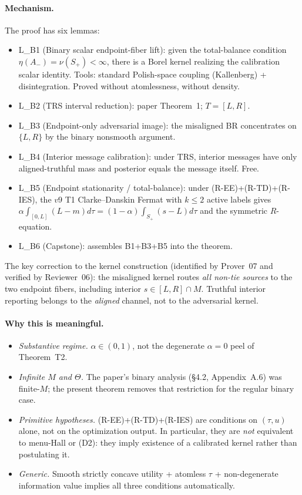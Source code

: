\documentclass[11pt]{article}
\theoremstyle{definition}
\theoremstyle{remark}
\begin{document}
\paragraph{Mechanism.} The proof has six lemmas:
\begin{itemize}
  \item L\_B1 (Binary scalar endpoint-fiber lift): given the
    total-balance condition $\eta(A_-) = \nu(S_+) < \infty$, there is a
    Borel kernel realizing the calibration scalar identity. Tools:
    standard Polish-space coupling (Kallenberg) + disintegration.
    Proved without atomlessness, without density.
  \item L\_B2 (TRS interval reduction): paper Theorem~1; $T = [L,R]$.
  \item L\_B3 (Endpoint-only adversarial image): the misaligned BR
    concentrates on $\{L, R\}$ by the binary nonsmooth argument.
  \item L\_B4 (Interior message calibration): under TRS, interior
    messages have only aligned-truthful mass and posterior equals the
    message itself. Free.
  \item L\_B5 (Endpoint stationarity / total-balance): under
    (R-EE)+(R-TD)+(R-IES), the $v9$ T1 Clarke--Danskin Fermat with
    $k\le 2$ active labels gives
    $\alpha\!\int_{[0,L]}(L-m)d\tau = (1-\alpha)\!\int_{S_+}(s-L)d\tau$
    and the symmetric $R$-equation.
  \item L\_B6 (Capstone): assembles B1+B3+B5 into the theorem.
\end{itemize}

The key correction to the kernel construction (identified by Prover~07
and verified by Reviewer~06): the misaligned kernel routes \emph{all
non-tie sources} to the two endpoint fibers, including interior
$s\in[L,R]\cap M$. Truthful interior reporting belongs to the
\emph{aligned} channel, not to the adversarial kernel.

\paragraph{Why this is meaningful.}
\begin{itemize}
  \item \emph{Substantive regime.} $\alpha\in(0,1)$, not the degenerate
    $\alpha=0$ peel of Theorem~T2.
  \item \emph{Infinite $M$ and $\Theta$.} The paper's binary analysis
    (\S4.2, Appendix~A.6) was finite-$M$; the present theorem removes
    that restriction for the regular binary case.
  \item \emph{Primitive hypotheses.} (R-EE)+(R-TD)+(R-IES) are
    conditions on $(\tau, u)$ alone, not on the optimization output.
    In particular, they are \emph{not} equivalent to menu-Hall or
    (D2): they imply existence of a calibrated kernel rather than
    postulating it.
  \item \emph{Generic.} Smooth strictly concave utility + atomless
    $\tau$ + non-degenerate information value implies all three
    conditions automatically.
\end{itemize}
\end{document}
